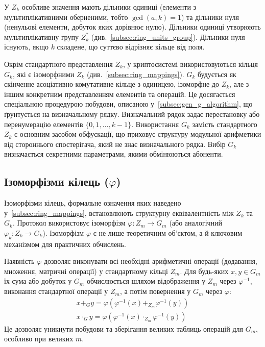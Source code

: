 У $Z_k$ особливе значення мають дільники одиниці (елементи з мультиплікативними оберненими, тобто $\gcd(a, k) = 1$) та дільники нуля (ненульові елементи, добуток яких дорівнює нулю).
Дільники одиниці утворюють мультиплікативну групу $Z_k^*$ (див.~\ref{subsec:ring_units_group}).
Дільники нуля існують, якщо $k$ складене, що суттєво відрізняє кільце від поля.

Окрім стандартного представлення $Z_k$, у криптосистемі використовуються кільця $G_k$, які є ізоморфними $Z_k$ (див.~\ref{subsec:ring_mappings}).
$G_k$ будується як скінченне асоціативно-комутативне кільце з одиницею, ізоморфне до $Z_k$, але з іншим конкретним представленням елементів та операцій.
Це досягається спеціальною процедурою побудови, описаною у~\ref{subsec:gen_g_algorithm}, що ґрунтується на визначальному рядку.
Визначальний рядок задає перестановку або перенумерацію елементів $\{0, 1, \ldots, k-1\}$.
Використання $G_k$ замість стандартного $Z_k$ є основним засобом обфускації, що приховує структуру модульної арифметики від стороннього спостерігача, який не знає визначального рядка.
Вибір $G_k$ визначається секретними параметрами, якими обмінюються абоненти.

\subsection{Ізоморфізми кілець (\(\varphi\))}
\label{subsec:ring_isomorphism}
Ізоморфізми кілець, формальне означення яких наведено у~\ref{subsec:ring_mappings}, встановлюють структурну еквівалентність між $Z_k$ та $G_k$.
Протокол використовує ізоморфізм $\varphi: Z_m \to G_m$ (або аналогічний $\varphi_k: Z_k \to G_k$).
Ізоморфізм $\varphi$ є не лише теоретичним об'єктом, а й ключовим механізмом для практичних обчислень.

Наявність $\varphi$ дозволяє виконувати всі необхідні арифметичні операції (додавання, множення, матричні операції) у стандартному кільці $Z_m$.
Для будь-яких $x, y \in G_m$ їх сума або добуток у $G_m$ обчислюється шляхом відображення у $Z_m$ через $\varphi^{-1}$, виконання стандартної операції у $Z_m$, а потім повернення у $G_m$ через $\varphi$:
\begin{gather*}
    x +_G y = \varphi(\varphi^{-1}(x) +_{Z_m} \varphi^{-1}(y))\\
    x \cdot_G y = \varphi(\varphi^{-1}(x) \cdot_{Z_m} \varphi^{-1}(y))
\end{gather*}
Це дозволяє уникнути побудови та зберігання великих таблиць операцій для $G_m$, особливо при великих $m$.

